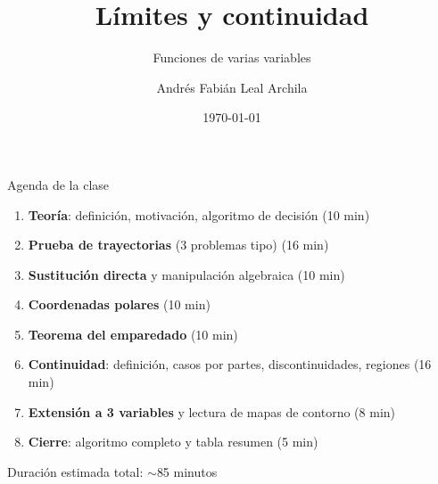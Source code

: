 \documentclass[11pt,aspectratio=169]{beamer}
\title{Límites y continuidad}
\subtitle{Funciones de varias variables}
\author{Andrés Fabián Leal Archila}
\institute{Cálculo III (Multivariable) --- Cód. 20254}
\date{\today}
\begin{document}
\portada

\begin{frame}{Agenda de la clase}
  \begin{enumerate}
    \setlength{\itemsep}{6pt}
    \item \textbf{Teoría}: definición, motivación, algoritmo de decisión \hfill{\small\color{gray60}(10 min)}
    \item \textbf{Prueba de trayectorias} (3 problemas tipo) \hfill{\small\color{gray60}(16 min)}
    \item \textbf{Sustitución directa} y manipulación algebraica \hfill{\small\color{gray60}(10 min)}
    \item \textbf{Coordenadas polares} \hfill{\small\color{gray60}(10 min)}
    \item \textbf{Teorema del emparedado} \hfill{\small\color{gray60}(10 min)}
    \item \textbf{Continuidad}: definición, casos por partes, discontinuidades, regiones \hfill{\small\color{gray60}(16 min)}
    \item \textbf{Extensión a 3 variables} y lectura de mapas de contorno \hfill{\small\color{gray60}(8 min)}
    \item \textbf{Cierre}: algoritmo completo y tabla resumen \hfill{\small\color{gray60}(5 min)}
  \end{enumerate}
  \vfill
  \begin{center}
    \small\color{gray60} Duración estimada total: $\sim$85 minutos
  \end{center}
\end{frame}

\end{document}
